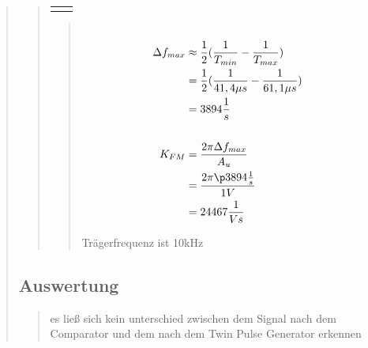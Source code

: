 \begin{quote}
\begin{quote}
\begin{center}
\begin{tabular}{ll}
\begin{minipage}{0.6\textwidth}
            \end{minipage}
        
        \end{tabular}
        \end{center}
        
        
        \begin{quote}
            
            
            
            
            \begin{equation*}
            \begin{split}
            \\
                \Delta f_{max} &\approx \frac{1}{2} (\frac{1}{T_{min}} - \frac{1}{T_{max}})\\
                               &= \frac{1}{2} (\frac{1}{41,4 \mu s} -\frac{1}{61,1 \mu s})\\
                               &= 3894 \frac{1}{s}\\
            \\
                K_{FM} &=\frac{2 \pi \Delta f_{max}}{A_u}\\
                       &= \frac{2 \pi \p 3894 \frac{1}{s}}{1V}\\
                       &= 24467 \frac{1}{Vs}
            \\
            \end{split}
            \end{equation*}
            
            
            Trägerfrequenz ist 10kHz
            
            
            
        \end{quote}


        
        
        
    \end{quote}
    
    
    
    
    
    \subsection{Auswertung}
    \begin{quote}
        
        es ließ sich kein unterschied zwischen dem Signal nach dem Comparator und dem nach dem Twin Pulse Generator erkennen
        
    \end{quote}
    
\end{quote}



